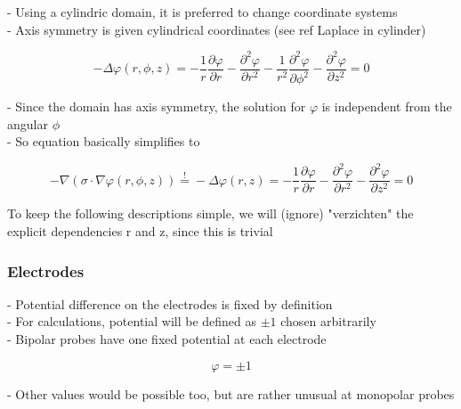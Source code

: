 \documentclass[parskip=half, titlepage=yes, 12pt, BCOR=12mm, DIV=calc]{scrartcl}
\begin{document}
- Using a cylindric domain, it is preferred to change coordinate systems \\
- Axis symmetry is given cylindrical coordinates (see ref Laplace in cylinder)

\begin{equation}
    - \Delta \varphi(r,\phi,z) = - \frac{1}{r} \frac{\partial \varphi}{\partial r} - \frac{\partial^2 \varphi}{\partial r^2} - \frac{1}{r^2} \frac{\partial^2 \varphi}{\partial \phi^2} -      \frac{\partial^2 \varphi}{\partial z^2}  = 0
\end{equation}

- Since the domain has axis symmetry, the solution for $\varphi$ is independent from the angular $\phi$ \\
- So equation basically simplifies to 


\begin{equation}
    - \nabla  ( \sigma \cdot \nabla \varphi(r,\phi,z)) \overset{!}{=} - \Delta \varphi(r,z) = - \frac{1}{r} \frac{\partial \varphi}{\partial r} - \frac{\partial^2 \varphi}{\partial r^2} - \frac{\partial^2 \varphi}{\partial z^2} = 0
\end{equation}

To keep the following descriptions simple, we will (ignore) "verzichten" the explicit dependencies r and z, since this is trivial

\subsubsection{Electrodes}

- Potential difference on the electrodes is fixed by definition \\
- For calculations, potential will be defined as $\pm 1$ chosen arbitrarily \\
- Bipolar probes have one fixed potential at each electrode

\begin{equation}
    \varphi = \pm 1
\end{equation}

- Other values would be possible too, but are rather unusual at monopolar probes \\
\end{document}
